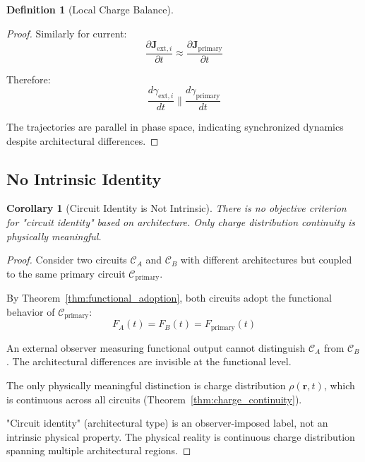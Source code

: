 \documentclass[12pt,a4paper]{article}
\theoremstyle{plain}
\newtheorem{corollary}[theorem]{Corollary}
\theoremstyle{definition}
\newtheorem{definition}[theorem]{Definition}
\theoremstyle{remark}
\begin{document}
\begin{definition}[Local Charge Balance]
\begin{proof}
Similarly for current:
\begin{equation}
\frac{\partial \mathbf{J}_{\text{ext},i}}{\partial t} \approx \frac{\partial \mathbf{J}_{\text{primary}}}{\partial t}
\end{equation}

Therefore:
\begin{equation}
\frac{d\gamma_{\text{ext},i}}{dt} \parallel \frac{d\gamma_{\text{primary}}}{dt}
\end{equation}

The trajectories are parallel in phase space, indicating synchronized dynamics despite architectural differences.
\end{proof}

\subsection{No Intrinsic Identity}

\begin{corollary}[Circuit Identity is Not Intrinsic]
\label{cor:no_intrinsic_identity}
There is no objective criterion for "circuit identity" based on architecture. Only charge distribution continuity is physically meaningful.
\end{corollary}

\begin{proof}
Consider two circuits $\mathcal{C}_A$ and $\mathcal{C}_B$ with different architectures but coupled to the same primary circuit $\mathcal{C}_{\text{primary}}$.

By Theorem~\ref{thm:functional_adoption}, both circuits adopt the functional behavior of $\mathcal{C}_{\text{primary}}$:
\begin{equation}
F_A(t) = F_B(t) = F_{\text{primary}}(t)
\end{equation}

An external observer measuring functional output cannot distinguish $\mathcal{C}_A$ from $\mathcal{C}_B$. The architectural differences are invisible at the functional level.

The only physically meaningful distinction is charge distribution $\rho(\mathbf{r}, t)$, which is continuous across all circuits (Theorem~\ref{thm:charge_continuity}).

"Circuit identity" (architectural type) is an observer-imposed label, not an intrinsic physical property. The physical reality is continuous charge distribution spanning multiple architectural regions.
\end{proof}


\end{definition}
\end{document}
